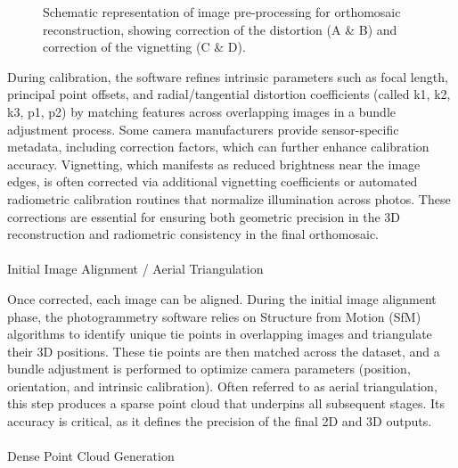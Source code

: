 \documentclass[
  letterpaper,
  11pt,
  english,
  singlespacing,
  headsepline]{MastersDoctoralThesis}
\makeatletter
\let\oldparagraph\paragraph
\renewcommand{\paragraph}{
    \@ifstar
      \xxxParagraphStar
      \xxxParagraphNoStar
  }
\newcommand{\xxxParagraphStar}[1]{\oldparagraph*{#1}\mbox{}}
\newcommand{\xxxParagraphNoStar}[1]{\oldparagraph{#1}\mbox{}}
\makeatother
\begin{document}
\begin{spacing}{1.5}
\begin{figure}


\caption{\label{fig-img_preprocessing}Schematic representation of image
pre-processing for orthomosaic reconstruction, showing correction of the
distortion (A \& B) and correction of the vignetting (C \& D).}

\end{figure}%

During calibration, the software refines intrinsic parameters such as
focal length, principal point offsets, and radial/tangential distortion
coefficients (called k1, k2, k3, p1, p2) by matching features across
overlapping images in a bundle adjustment process. Some camera
manufacturers provide sensor-specific metadata, including correction
factors, which can further enhance calibration accuracy. Vignetting,
which manifests as reduced brightness near the image edges, is often
corrected via additional vignetting coefficients or automated
radiometric calibration routines that normalize illumination across
photos. These corrections are essential for ensuring both geometric
precision in the 3D reconstruction and radiometric consistency in the
final orthomosaic.

\paragraph{Initial Image Alignment / Aerial
Triangulation}\label{initial-image-alignment-aerial-triangulation}

Once corrected, each image can be aligned. During the initial image
alignment phase, the photogrammetry software relies on Structure from
Motion (SfM) algorithms to identify unique tie points in overlapping
images and triangulate their 3D positions. These tie points are then
matched across the dataset, and a bundle adjustment is performed to
optimize camera parameters (position, orientation, and intrinsic
calibration). Often referred to as aerial triangulation, this step
produces a sparse point cloud that underpins all subsequent stages. Its
accuracy is critical, as it defines the precision of the final 2D and 3D
outputs.

\paragraph{Dense Point Cloud Generation}\label{sec-DPC}


\end{spacing}
\end{document}
